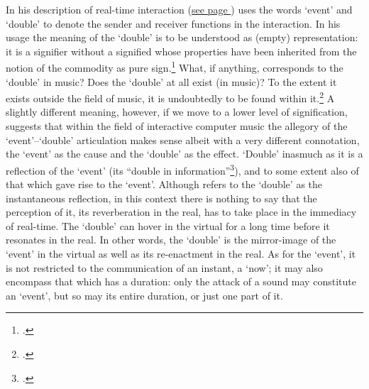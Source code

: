 In his description of real-time interaction (\hyperlink{sec:human-comp-inter:7-1}{see page \pageref*{sec:label:human-comp-inter:7}}) \citeauthor{baudrillard96} uses the words `event' and `double' to denote the sender and receiver functions in the interaction. In his usage the meaning of the `double' is to be understood as (empty) representation: it is a signifier without a signified whose properties have been inherited from the notion of the commodity as pure sign.\footcite[See][36]{plant92} What, if anything, corresponds to the `double' in music? Does the `double' at all exist (in music)? To the extent it exists outside the field of music, it is undoubtedly to be found within it.\footcites(The `commodification' of music and art is a recurring theme in Adorno's writing.)()[See][Chap. 1: ``On the Fetish-Character of Music and the Regression of Listening'']{adorno91}[See also][Chap. 4: ``The Culture Industry'']{adorno97}[For a perhaps more nuanced view on the relation between capitalism and music see][43-5]{attali85} A slightly different meaning, however, if we move to a lower level of signification, suggests that within the field of interactive computer music the allegory of the `event'--`double' articulation makes sense albeit with a very different connotation, the `event' as the cause and the `double' as the effect. `Double' inasmuch as it is a reflection of the `event' (its ``double in information''\footcite[30]{baudrillard96:writing}), and to some extent also of that which gave rise to the `event'. Although \citeauthor{baudrillard96} refers to the `double' as the instantaneous reflection, in this context there is nothing to say that the perception of it, its reverberation in the real, has to take place in the immediacy of real-time. The `double' can hover in the virtual for a long time before it resonates in the real. In other words, the `double' is the mirror-image of the `event' in the virtual as well as its re-enactment in the real. As for the `event', it is not restricted to the communication of an instant, a `now'; it may also encompass that which has a duration: only the attack of a sound may constitute an `event', but so may its entire duration, or just one part of it.


